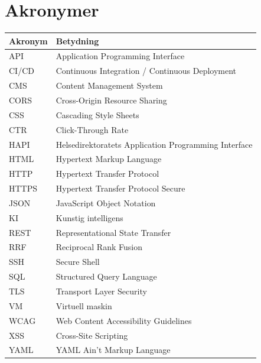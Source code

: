 \section*{Akronymer}

\begin{table}[H]
\begin{tabular}{ll}
\textbf{Akronym} & \textbf{Betydning} \\
\hline
API   & Application Programming Interface \\
CI/CD & Continuous Integration / Continuous Deployment \\
CMS   & Content Management System \\
CORS  & Cross-Origin Resource Sharing \\
CSS   & Cascading Style Sheets \\
CTR   & Click-Through Rate \\
HAPI  & Helsedirektoratets Application Programming Interface \\
HTML  & Hypertext Markup Language \\
HTTP  & Hypertext Transfer Protocol \\
HTTPS & Hypertext Transfer Protocol Secure \\
JSON  & JavaScript Object Notation \\
KI    & Kunstig intelligens \\
REST  & Representational State Transfer \\
RRF   & Reciprocal Rank Fusion \\
SSH   & Secure Shell \\
SQL   & Structured Query Language \\
TLS   & Transport Layer Security \\
VM    & Virtuell maskin \\
WCAG  & Web Content Accessibility Guidelines \\
XSS   & Cross-Site Scripting \\
YAML  & YAML Ain't Markup Language \\
\end{tabular}
\end{table}
